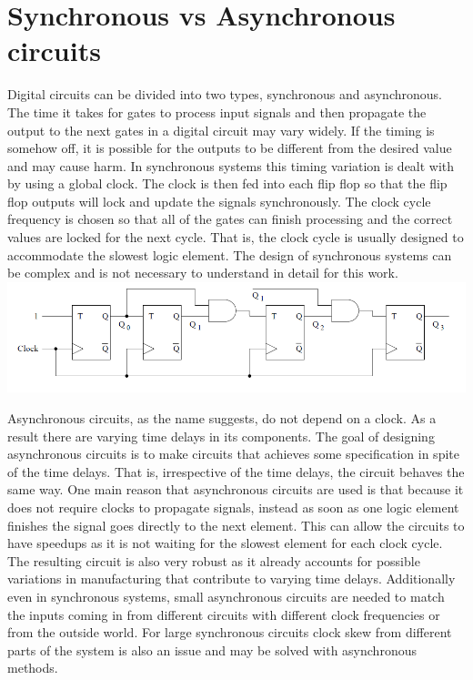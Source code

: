 \documentclass[12pt]{report}
\begin{document}
\section{Synchronous vs Asynchronous circuits}
Digital circuits can be divided into two types, synchronous and asynchronous.  The time it takes for gates to process input signals and then propagate the output to the next gates in a digital circuit may vary widely.  If the timing is somehow off, it is possible for the outputs to be different from the desired value and may cause harm. In synchronous systems this timing variation is dealt with by using a global clock.  The clock is then fed into each flip flop so that the flip flop outputs will lock and update the signals synchronously. The clock cycle frequency is chosen so that all of the gates can finish processing and the correct values are locked for the next cycle. That is, the clock cycle is usually designed to accommodate the slowest logic element. The design of synchronous systems can be complex and is not necessary to understand in detail for this work. \\
\includegraphics[width=\textwidth]{syncex}

Asynchronous circuits, as the name suggests, do not depend on a clock. As a result there are varying time delays in its components. The goal of designing asynchronous circuits is to make circuits that achieves some specification in spite of the time delays. That is, irrespective of the time delays, the circuit behaves the same way. One main reason that asynchronous circuits are used is that because it does not require clocks to propagate signals, instead as soon as one logic element finishes the signal goes directly to the next element.  This can allow the circuits to have speedups as it is not waiting for the slowest element for each clock cycle.  The resulting circuit is also very robust as it already accounts for possible variations in manufacturing that contribute to varying time delays.  Additionally even in synchronous systems, small asynchronous circuits are needed to match the inputs coming in from different circuits with different clock frequencies or from the outside world.  For large synchronous circuits clock skew from different parts of the system is also an issue and may be solved with asynchronous methods. \\ %
\end{document}
